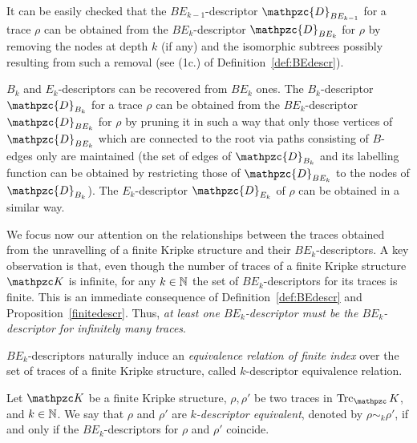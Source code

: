 It can be easily checked that the $BE_{k-1}$-descriptor $\mathpzc{D}_{BE_{k-1}}$ for a trace $\rho$ can be obtained from the 
$BE_k$-descriptor $\mathpzc{D}_{BE_k}$ for $\rho$ by removing the nodes at depth $k$ (if any) and the isomorphic subtrees possibly resulting from such a removal (see (1c.) of Definition~\ref{def:BEdescr}). %

$B_k$ and $E_k$-descriptors can be recovered from $BE_k$ ones. The $B_k$-descriptor $\mathpzc{D}_{B_k}$ for a trace $\rho$ can be obtained from the $BE_k$-descriptor $\mathpzc{D}_{BE_k}$ for $\rho$ by pruning it in such a way that only those vertices of $\mathpzc{D}_{BE_k}$ which are connected to the root via paths consisting of $B$-edges only are maintained (the set of edges of $\mathpzc{D}_{B_k}$ and its labelling function can be obtained by restricting those of $\mathpzc{D}_{BE_k}$ to the nodes of $\mathpzc{D}_{B_k}$). The $E_k$-descriptor $\mathpzc{D}_{E_k}$ of $\rho$ can be obtained in a similar way.



We focus now our attention on the relationships between the traces obtained from the unravelling of a finite Kripke structure and their $BE_k$-descriptors. A key observation is that, even though the number of traces of a finite Kripke structure $\Ku$ is infinite, for any $k\in\mathbb{N}$ the set of $BE_k$-descriptors for its traces is finite. This is an immediate consequence of Definition~\ref{def:BEdescr} and Proposition~\ref{finitedescr}. Thus, \emph{at least one $BE_k$-descriptor must be the $BE_k$-descriptor for infinitely many traces}. 

$BE_k$-descriptors naturally induce an \emph{equivalence relation of finite index} over the set of traces of a finite Kripke structure, called $k$-descriptor equivalence relation.

\begin{definition}
Let $\Ku$ be a finite Kripke structure, $\rho,\rho'$ be two traces in $\Trk_\Ku$,
and $k \in \mathbb{N}$. We say that $\rho$ and $\rho'$ are \emph{$k$-descriptor equivalent}, denoted by $\rho\sim_k\rho'$, if and only if the $BE_k$-descriptors for $\rho$ and $\rho'$ coincide.
\end{definition}

